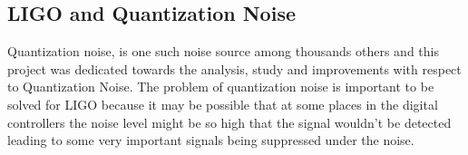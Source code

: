 \documentclass[a4paper,12pt]{article}
\begin{document}
	\subsection{LIGO and Quantization Noise}Quantization noise, is one such noise source among thousands others and this project was dedicated towards the analysis, study and improvements with respect to Quantization Noise. The problem of quantization noise is important to be solved for LIGO because it may be possible that at some places in the digital controllers the noise level might be so high that the signal wouldn't be detected leading to some very important signals being suppressed under the noise.
\end{document}
